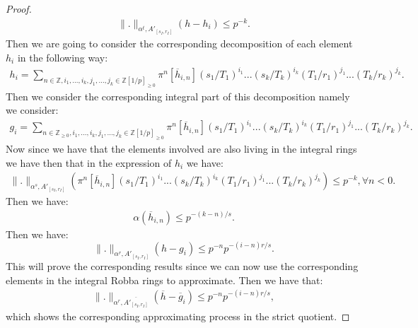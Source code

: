 \documentclass[12pt]{amsart}
\theoremstyle{definition}
\numberwithin{equation}{section}
\begin{document}
\begin{proof}
\begin{align}
\|.\|_{\alpha^t,A'_{[s_I,r_I]}}(h-h_i)\leq p^{-k}.	
\end{align}
Then we are going to consider the corresponding decomposition of each element $h_i$ in the following way:
\begin{align}
h_i=\sum_{n\in \mathbb{Z},i_1,...,i_k,j_1,...,j_k\in \mathbb{Z}[1/p]_{\geq 0}}\pi^n[\overline{h}_{i,n}](s_1/T_1)^{i_1}...(s_k/T_k)^{i_k}(T_1/r_1)^{j_1}...(T_k/r_k)^{j_k}.	
\end{align}
Then we consider the corresponding integral part of this decomposition namely we consider:
\begin{align}
g_i=\sum_{n\in \mathbb{Z}_{\geq 0},i_1,...,i_k,j_1,...,j_k\in \mathbb{Z}[1/p]_{\geq 0}}\pi^n[\overline{h}_{i,n}](s_1/T_1)^{i_1}...(s_k/T_k)^{i_k}(T_1/r_1)^{j_1}...(T_k/r_k)^{j_k}.	
\end{align}
Now since we have that the elements involved are also living in the integral rings we have then that in the expression of $h_i$ we have:
\begin{align}
\|.\|_{\alpha^s,A'_{[s_I,r_I]}}(\pi^n[\overline{h}_{i,n}](s_1/T_1)^{i_1}...(s_k/T_k)^{i_k}(T_1/r_1)^{j_1}...(T_k/r_k)^{j_k})\leq p^{-k},\forall n<0.	
\end{align}
Then we have:
\begin{align}
{\alpha}(\overline{h}_{i,n})\leq p^{-(k-n)/s}.	
\end{align}
Then we have:
\begin{displaymath}
\|.\|_{\alpha^r,A'_{[s_I,r_I]}}(h-g_i)\leq p^{-n}p^{-(i-n)r/s}.	
\end{displaymath}
This will prove the corresponding results since we can now use the corresponding elements in the integral Robba rings to approximate. Then we have that:
\begin{align}
\|.\|_{\alpha^r,\overline{A'_{[s_I,r_I]}}}(\overline{h}-\overline{g}_i)\leq p^{-n}p^{-(i-n)r/s},	
\end{align}
which shows the corresponding approximating process in the strict quotient.


\end{proof}
\end{document}
